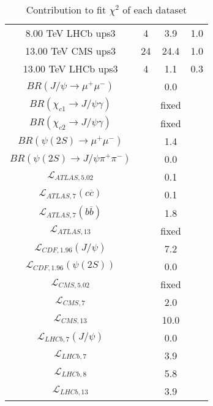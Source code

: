 \begin{table}[h!]
\begin{tabular}{c|c|c|c}
8.00 TeV LHCb ups3 & 4 & 3.9 & 1.0 \\
13.00 TeV CMS ups3 & 24 & 24.4 & 1.0 \\
13.00 TeV LHCb ups3 & 4 & 1.1 & 0.3 \\
\hline
$BR(J/\psi\rightarrow\mu^+\mu^-)$ &  & 0.0 &  \\
$BR(\chi_{c1}\rightarrow J/\psi\gamma)$ &  & fixed & \\
$BR(\chi_{c2}\rightarrow J/\psi\gamma)$ &  & fixed & \\
$BR(\psi(2S)\rightarrow\mu^+\mu^-)$ &  & 1.4 &  \\
$BR(\psi(2S)\rightarrow J/\psi\pi^+\pi^-)$ &  & 0.0 &  \\
$\mathcal L_{ATLAS,5.02}$ &  & 0.1 &  \\
$\mathcal L_{ATLAS,7}(c\overline c)$ &  & 0.1 &  \\
$\mathcal L_{ATLAS,7}(b\overline b)$ &  & 1.8 &  \\
$\mathcal L_{ATLAS,13}$ &  & fixed & \\
$\mathcal L_{CDF,1.96}(J/\psi)$ &  & 7.2 &  \\
$\mathcal L_{CDF,1.96}(\psi(2S))$ &  & 0.0 &  \\
$\mathcal L_{CMS,5.02}$ &  & fixed & \\
$\mathcal L_{CMS,7}$ &  & 2.0 &  \\
$\mathcal L_{CMS,13}$ &  & 10.0 &  \\
$\mathcal L_{LHCb,7}(J/\psi)$ &  & 0.0 &  \\
$\mathcal L_{LHCb,7}$ &  & 3.9 &  \\
$\mathcal L_{LHCb,8}$ &  & 5.8 &  \\
$\mathcal L_{LHCb,13}$ &  & 3.9 &  \\
\end{tabular}
\caption{Contribution to fit $\chi^2$ of each dataset}
\end{table}
